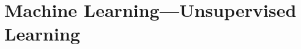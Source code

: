 \part{Machine Learning---Unsupervised Learning}

\renewcommand{\thispartpath}{\basepath/unsupervised}

\renewcommand{\thischapterpath}{\thispartpath/learn}


\renewcommand{\thischapterpath}{\thispartpath/kmean}


\renewcommand{\thischapterpath}{\thispartpath/hierarchical}


\renewcommand{\thischapterpath}{\thispartpath/clusterlimit}


\renewcommand{\thischapterpath}{\thispartpath/precision}

